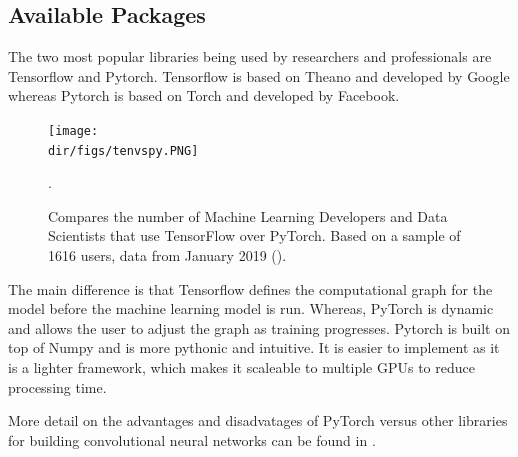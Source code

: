 \subsection{Available Packages}
The two most popular libraries being used by researchers and professionals are Tensorflow and Pytorch. Tensorflow is based on Theano and developed by Google whereas Pytorch is based on Torch and developed by Facebook.
\begin{figure}[htpb]
    \centering
    \texttt{[image: \\dir/figs/tenvspy.PNG]}
    \caption[TensorFlow versus PyTorch Usage]{Compares the number of Machine Learning Developers and Data Scientists that use TensorFlow over PyTorch. Based on a sample of 1616 users, data from January 2019 (\cite{Rosenzvaig19}). }.
    \label{fig.tfvspy}
\end{figure}
The main difference is that Tensorflow defines the computational graph for the model before the machine learning model is run. Whereas, PyTorch is dynamic and allows the user to adjust the graph as training progresses. Pytorch is built on top of Numpy and is more pythonic and intuitive. It is easier to implement as it is a lighter framework, which makes it scaleable to multiple GPUs to reduce processing time.
\par
More detail on the advantages and disadvatages of PyTorch versus other libraries for building convolutional neural networks can be found in \citet{Richmond19b}.

